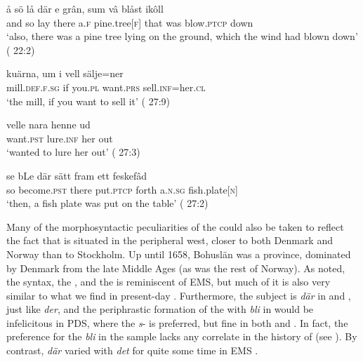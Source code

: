\documentclass[output=paper]{langscibook}
\begin{document}
\ea \label{ex:intro:39}
\ea \label{ex:intro:39a}
\gll å     sö lå   där    e     grân,     sum   vâ   blåst       ikôll\\
      and    so lay     there  a.\textsc{f}  pine.tree[\textsc{f}]    that     was blow\textsc{.ptcp}   down\\
\glt       ‘also, there was a pine tree lying on the ground, which the       wind had blown down’ ( 22:2)

\ex \label{ex:intro:39b}
\gll  kuärna,       um   i       vell       sälje=ner\\
    mill\textsc{.def.f.sg}   if     you\textsc{.pl}   want.\textsc{prs}   sell.\textsc{inf}=her.\textsc{cl}\\
\glt `the mill, if you want to sell it’ ( 27:9)

\ex \label{ex:intro:39c}
\gll  velle       nara     henne   ud\\
    want.\textsc{pst}   lure.\textsc{inf}  her     out\\
\glt `wanted to lure her out’ ( 27:3)

\ex \label{ex:intro:39d}
\gll  se bLe         där   sätt       fram   ett     feskefâd\\
    so become.\textsc{pst}   there   put.\textsc{ptcp}   forth   a.\textsc{n.sg}   fish.plate[\textsc{n}]\\
\glt `then, a fish plate was put on the table’ ( 27:2)
\z
\z


Many of the morphosyntactic peculiarities of the   could also be taken to reflect the fact that  is situated in the peripheral west, closer to both Denmark and Norway than to Stockholm. Up until 1658, Bohuslän was a  province, dominated by Denmark from the late Middle Ages (as was the rest of Norway). As noted, the   syntax, the , and the  is reminiscent of EMS, but much of it is also very similar to what we find in present-day . Furthermore, the  subject is \textit{där} in  and , just like  \textit{der}, and the periphrastic formation of the  with \textit{bli} in  would be infelicitous in PDS, where the \textit{s}{}- is preferred, but fine in both  and . In fact, the preference for the \textit{bli}  in the  sample lacks any correlate in the history of  (see ). By contrast,  \textit{där} varied with \textit{det} for quite some time in EMS \citep{Falk1993}.
\end{document}
